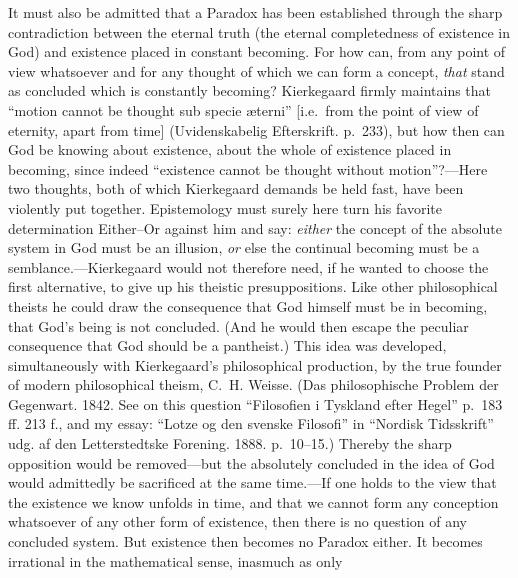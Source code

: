 \documentclass[12pt,a4paper]{book}
\newcommand{\opage}[1]{\marginnote{\footnotesize\textit{[#1]}}}
\begin{document}
It must also be admitted that a Paradox has been established through the
sharp contradiction between the eternal truth (the eternal completedness
of existence in God) and existence placed in constant becoming. For how
can, from any point of view whatsoever and for any thought of which we
can form a concept, \textit{that} stand as concluded which is constantly
becoming? Kierkegaard firmly maintains that ``motion cannot be thought
sub specie æterni'' [i.e.\ from the point of view of eternity, apart from
time] (Uvidenskabelig Efterskrift. p.~233), but how then can God be
knowing about existence, about the whole of existence placed in
becoming, since indeed ``existence cannot be thought without
motion''?---Here two thoughts, both of which Kierkegaard demands be held
fast, have been violently put together. Epistemology must surely here
turn his favorite determination Either--Or against him and say:
\textit{either} the concept of the absolute system in God must be an
illusion, \textit{or} else the continual becoming must be a
semblance.---Kierkegaard would not therefore need, if he wanted to choose
the first alternative, to give up his theistic presuppositions. Like
other philosophical theists he could
\opage{65}draw the consequence that God himself must be in becoming, that God's
being is not concluded. (And he would then escape the peculiar
consequence that God should be a pantheist.) This idea was developed,
simultaneously with Kierkegaard's philosophical production, by the true
founder of modern philosophical theism, C.~H. Weisse. (Das philosophische
Problem der Gegenwart. 1842. See on this question ``Filosofien i Tyskland
efter Hegel'' p.~183 ff. 213 f., and my essay: ``Lotze og den svenske
Filosofi'' in ``Nordisk Tidsskrift'' udg. af den Letterstedtske
Forening. 1888. p.~10--15.) Thereby the sharp opposition would be
removed---but the absolutely concluded in the idea of God would
admittedly be sacrificed at the same time.---If one holds to the view
that the existence we know unfolds in time, and that we cannot form any
conception whatsoever of any other form of existence, then there is no
question of any concluded system. But existence then becomes no Paradox
either. It becomes irrational in the mathematical sense, inasmuch as only
\end{document}
